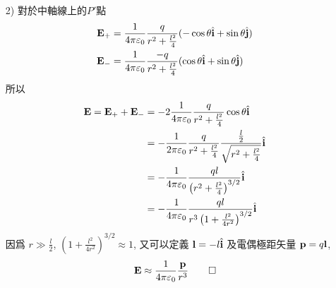 \begin{solve}
\begin{itemize}
        \item[2)]對於中軸線上的$P'$點
              \begin{align*}
                  \mathbf{E}_+ & = \frac{1}{4\pi\varepsilon_0}\frac{q}{r^2 + \frac{l^2}{4}}(-\cos \theta \hat{\mathbf{i}} + \sin \theta \hat{\mathbf{j}}) \\
                  \mathbf{E}_- & = \frac{1}{4\pi\varepsilon_0}\frac{-q}{r^2 + \frac{l^2}{4}}(\cos \theta \hat{\mathbf{i}} + \sin \theta \hat{\mathbf{j}})
              \end{align*}
              所以
              \begin{align*}
                  \mathbf{E} = \mathbf{E}_{+} + \mathbf{E}_{-} & = -2\frac{1}{4\pi\varepsilon_0}\frac{q}{r^2 + \frac{l^2}{4}}\cos \theta \hat{\mathbf{i}}                                   \\
                                                   & = -\frac{1}{2\pi\varepsilon_0}\frac{q}{r^2 + \frac{l^2}{4}}\frac{\frac{l}{2}}{\sqrt{r^2 + \frac{l^2}{4}}} \hat{\mathbf{i}} \\
                                                   & = -\frac{1}{4\pi\varepsilon_0}\frac{ql}{\left(r^2 + \frac{l^2}{4}\right)^{3/2}} \hat{\mathbf{i}}                           \\
                                                   & = -\frac{1}{4\pi\varepsilon_0}\frac{ql}{r^3\left(1 + \frac{l^2}{4r^2}\right)^{3/2}} \hat{\mathbf{i}}
              \end{align*}
              因爲 $r \gg \frac{l}{2}$, $\left(1 + \frac{l^2}{4r^2}\right)^{3/2} \approx 1$, 又可以定義 $\mathbf{l} = -l\hat{\mathbf{i}}$ 及電偶極距矢量 $\mathbf{p} = q\mathbf{l}$,
              \begin{equation*}
                  \mathbf{E} \approx \frac{1}{4\pi\varepsilon_0}\frac{\mathbf{p}}{r^3} \qedhere
              \end{equation*}
    \end{itemize}
\end{solve}